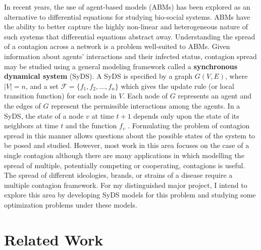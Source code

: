 \documentclass[11pt]{article}
\begin{document}
 In recent years, the use of agent-based models (ABMs) has been explored as an alternative to differential equations for studying bio-social systems. ABMs have the ability to better capture the highly non-linear and  heterogeneous nature of such systems that differential equations abstract away. Understanding the spread of a contagion across a network is a problem well-suited to ABMs. Given information about agents' interactions and their infected status, contagion spread may be studied using a general modeling framework called a \textbf{synchronous dynamical system} (SyDS). A SyDS is specified by a graph $G(V, E)$, where $|V| = n$, and a set $\mathcal{F}=\{f_1, f_2, \ldots, f_n\}$ which gives the update rule (or local transition function) for each node in $V$. Each node of $G$ represents an agent and the edges of $G$ represent the permissible interactions among the agents. In a SyDS, the state of a node $v$ at time $t+1$ depends only upon the state of its neighbors at time $t$ and the function $f_v$ \cite{Adiga-etal-2019}. Formulating the problem of contagion spread in this manner allows questions about the possible states of the system to be posed and studied. However, most work in this area focuses on the case of a single contagion although there are many applications in which modelling the spread of multiple, potentially competing or cooperating, contagions is useful. The spread of different ideologies, brands, or strains of a disease require a multiple contagion framework. For my distinguished major project, I intend to explore this area by developing SyDS models for this problem and studying some optimization problems under these models.
 
 
 \section{Related Work}\label{sec:related}
  
\end{document}
